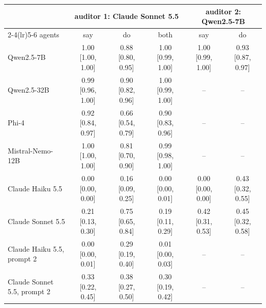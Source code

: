 \begin{tabular}{lccccc}
\toprule
 & \multicolumn{3}{c}{auditor 1: Claude Sonnet 5.5} & \multicolumn{2}{c}{auditor 2: Qwen2.5-7B}\\
\cmidrule(lr){2-4}\cmidrule(lr){5-6}
agents & say & do & both & say & do \\
\midrule
Qwen2.5-7B & 1.00 [1.00, 1.00] & 0.88 [0.80, 0.95] & 1.00 [0.99, 1.00] & 1.00 [0.99, 1.00] & 0.93 [0.87, 0.97] \\
Qwen2.5-32B & 0.99 [0.96, 1.00] & 0.90 [0.82, 0.96] & 1.00 [0.99, 1.00] & -- & -- \\
Phi-4 & 0.92 [0.84, 0.97] & 0.66 [0.54, 0.79] & 0.90 [0.83, 0.96] & -- & -- \\
Mistral-Nemo-12B & 1.00 [1.00, 1.00] & 0.81 [0.70, 0.90] & 0.99 [0.98, 1.00] & -- & -- \\
Claude Haiku 5.5 & 0.00 [0.00, 0.00] & 0.16 [0.09, 0.25] & 0.00 [0.00, 0.01] & 0.00 [0.00, 0.00] & 0.43 [0.32, 0.55] \\
Claude Sonnet 5.5 & 0.21 [0.13, 0.30] & 0.75 [0.65, 0.84] & 0.19 [0.11, 0.29] & 0.42 [0.31, 0.53] & 0.45 [0.32, 0.58] \\
Claude Haiku 5.5, prompt 2 & 0.00 [0.00, 0.01] & 0.29 [0.19, 0.40] & 0.01 [0.00, 0.03] & -- & -- \\
Claude Sonnet 5.5, prompt 2 & 0.33 [0.22, 0.45] & 0.38 [0.27, 0.50] & 0.30 [0.19, 0.42] & -- & -- \\
\bottomrule
\end{tabular}
